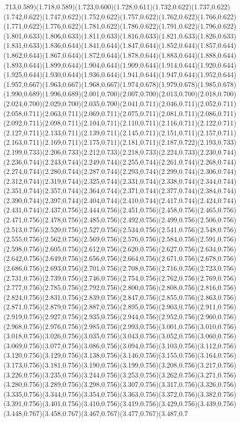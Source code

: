 \documentclass[smallextended]{svjour3}
\begin{document}
.713,0.589)(1.718,0.589)(1.723,0.600)(1.728,0.611)(1.732,0.622)(1.737,0.622)(1.742,0.622)(1.747,0.622)(1.752,0.622)(1.757,0.622)(1.762,0.622)(1.766,0.622)(1.771,0.622)(1.776,0.622)(1.781,0.622)(1.786,0.622)(1.791,0.622)(1.796,0.622)(1.801,0.633)(1.806,0.633)(1.811,0.633)(1.816,0.633)(1.821,0.633)(1.826,0.633)(1.831,0.633)(1.836,0.644)(1.841,0.644)(1.847,0.644)(1.852,0.644)(1.857,0.644)(1.862,0.644)(1.867,0.644)(1.872,0.644)(1.878,0.644)(1.883,0.644)(1.888,0.644)(1.893,0.644)(1.899,0.644)(1.904,0.644)(1.909,0.644)(1.914,0.644)(1.920,0.644)(1.925,0.644)(1.930,0.644)(1.936,0.644)(1.941,0.644)(1.947,0.644)(1.952,0.644)(1.957,0.667)(1.963,0.667)(1.968,0.667)(1.974,0.678)(1.979,0.678)(1.985,0.678)(1.990,0.689)(1.996,0.689)(2.001,0.700)(2.007,0.700)(2.013,0.700)(2.018,0.700)(2.024,0.700)(2.029,0.700)(2.035,0.700)(2.041,0.711)(2.046,0.711)(2.052,0.711)(2.058,0.711)(2.063,0.711)(2.069,0.711)(2.075,0.711)(2.081,0.711)(2.086,0.711)(2.092,0.711)(2.098,0.711)(2.104,0.711)(2.110,0.711)(2.116,0.711)(2.122,0.711)(2.127,0.711)(2.133,0.711)(2.139,0.711)(2.145,0.711)(2.151,0.711)(2.157,0.711)(2.163,0.711)(2.169,0.711)(2.175,0.711)(2.181,0.711)(2.187,0.722)(2.193,0.733)(2.199,0.733)(2.206,0.733)(2.212,0.733)(2.218,0.733)(2.224,0.733)(2.230,0.744)(2.236,0.744)(2.243,0.744)(2.249,0.744)(2.255,0.744)(2.261,0.744)(2.268,0.744)(2.274,0.744)(2.280,0.744)(2.287,0.744)(2.293,0.744)(2.299,0.744)(2.306,0.744)(2.312,0.744)(2.319,0.744)(2.325,0.744)(2.331,0.744)(2.338,0.744)(2.344,0.744)(2.351,0.744)(2.357,0.744)(2.364,0.744)(2.371,0.744)(2.377,0.744)(2.384,0.744)(2.390,0.744)(2.397,0.744)(2.404,0.744)(2.410,0.744)(2.417,0.744)(2.424,0.744)(2.431,0.744)(2.437,0.756)(2.444,0.756)(2.451,0.756)(2.458,0.756)(2.465,0.756)(2.471,0.756)(2.478,0.756)(2.485,0.756)(2.492,0.756)(2.499,0.756)(2.506,0.756)(2.513,0.756)(2.520,0.756)(2.527,0.756)(2.534,0.756)(2.541,0.756)(2.548,0.756)(2.555,0.756)(2.562,0.756)(2.569,0.756)(2.576,0.756)(2.584,0.756)(2.591,0.756)(2.598,0.756)(2.605,0.756)(2.612,0.756)(2.620,0.756)(2.627,0.756)(2.634,0.756)(2.642,0.756)(2.649,0.756)(2.656,0.756)(2.664,0.756)(2.671,0.756)(2.678,0.756)(2.686,0.756)(2.693,0.756)(2.701,0.756)(2.708,0.756)(2.716,0.756)(2.723,0.756)(2.731,0.756)(2.739,0.756)(2.746,0.756)(2.754,0.756)(2.762,0.756)(2.769,0.756)(2.777,0.756)(2.785,0.756)(2.792,0.756)(2.800,0.756)(2.808,0.756)(2.816,0.756)(2.824,0.756)(2.831,0.756)(2.839,0.756)(2.847,0.756)(2.855,0.756)(2.863,0.756)(2.871,0.756)(2.879,0.756)(2.887,0.756)(2.895,0.756)(2.903,0.756)(2.911,0.756)(2.919,0.756)(2.927,0.756)(2.935,0.756)(2.944,0.756)(2.952,0.756)(2.960,0.756)(2.968,0.756)(2.976,0.756)(2.985,0.756)(2.993,0.756)(3.001,0.756)(3.010,0.756)(3.018,0.756)(3.026,0.756)(3.035,0.756)(3.043,0.756)(3.052,0.756)(3.060,0.756)(3.069,0.756)(3.077,0.756)(3.086,0.756)(3.094,0.756)(3.103,0.756)(3.112,0.756)(3.120,0.756)(3.129,0.756)(3.138,0.756)(3.146,0.756)(3.155,0.756)(3.164,0.756)(3.173,0.756)(3.181,0.756)(3.190,0.756)(3.199,0.756)(3.208,0.756)(3.217,0.756)(3.226,0.756)(3.235,0.756)(3.244,0.756)(3.253,0.756)(3.262,0.756)(3.271,0.756)(3.280,0.756)(3.289,0.756)(3.298,0.756)(3.307,0.756)(3.317,0.756)(3.326,0.756)(3.335,0.756)(3.344,0.756)(3.354,0.756)(3.363,0.756)(3.372,0.756)(3.382,0.756)(3.391,0.756)(3.401,0.756)(3.410,0.756)(3.419,0.756)(3.429,0.756)(3.439,0.756)(3.448,0.767)(3.458,0.767)(3.467,0.767)(3.477,0.767)(3.487,0.7
\end{document}
